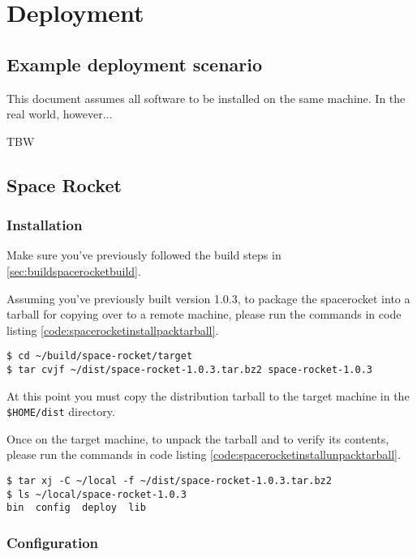 \section{Deployment}

\subsection{Example deployment scenario}

This document assumes all software to be installed on the same machine.
In the real world, however...

\ac{TBW}

\subsection{Space Rocket}

\subsubsection{Installation}

Make sure you've previously followed the build steps in
\ref{sec:buildspacerocketbuild}.

Assuming you've previously built version 1.0.3, to package the
spacerocket into a tarball for copying over to a remote machine, please
run the commands in code listing
\ref{code:spacerocketinstallpacktarball}.

\begin{lstlisting}[label=code:spacerocketinstallpacktarball,caption=Preparing
the space rocket's distribution tarball]
$ cd ~/build/space-rocket/target
$ tar cvjf ~/dist/space-rocket-1.0.3.tar.bz2 space-rocket-1.0.3
\end{lstlisting}

At this point you must copy the distribution tarball to the target
machine in the \texttt{\$HOME/dist} directory.

Once on the target machine, to unpack the tarball and to verify its
contents, please run the commands in code listing
\ref{code:spacerocketinstallunpacktarball}.

\begin{lstlisting}[label=code:spacerocketinstallunpacktarball,caption=Unpacking
the space rocket's distribution tarball]
$ tar xj -C ~/local -f ~/dist/space-rocket-1.0.3.tar.bz2
$ ls ~/local/space-rocket-1.0.3
bin  config  deploy  lib
\end{lstlisting}

\subsubsection{Configuration}

